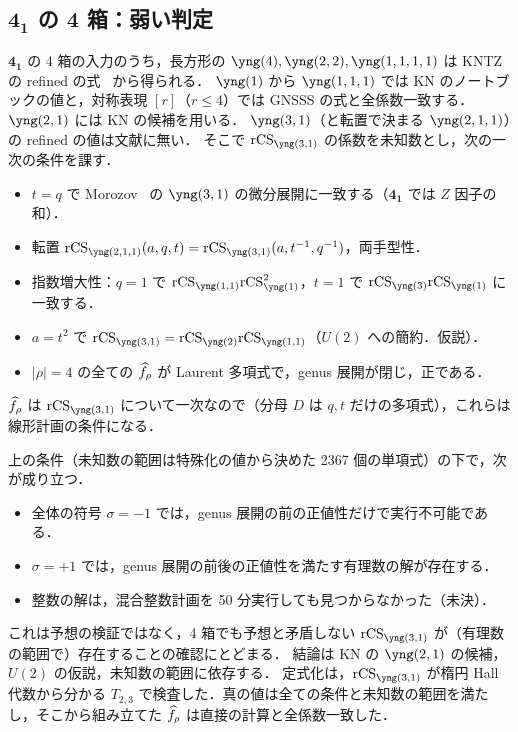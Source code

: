 \subsection{\texorpdfstring{$\mathbf{4_1}$ の 4 箱：弱い判定}{4\_1 の 4 箱：弱い判定}}\label{sec:fig8-four}
$\mathbf{4_1}$ の 4 箱の入力のうち，長方形の $\yng(4),\yng(2,2),\yng(1,1,1,1)$ は KNTZ の refined の式~\cite{Kameyama19} から得られる．
$\yng(1)$ から $\yng(1,1,1)$ では KN のノートブックの値と，対称表現 $[r]$（$r\le4$）では GNSSS の式と全係数一致する．
$\yng(2,1)$ には KN の候補を用いる．
$\yng(3,1)$（と転置で決まる $\yng(2,1,1)$）の refined の値は文献に無い．
そこで $\rCS_{\yng(3,1)}$ の係数を未知数とし，次の一次の条件を課す．
\begin{itemize}
\item $t=q$ で Morozov~\cite{Morozov16} の $\yng(3,1)$ の微分展開に一致する（$\mathbf{4_1}$ では $Z$ 因子の和）．
\item 転置 $\rCS_{\yng(2,1,1)}(a,q,t)=\rCS_{\yng(3,1)}(a,t^{-1},q^{-1})$，両手型性．
\item 指数増大性：$q=1$ で $\rCS_{\yng(1,1)}\rCS_{\yng(1)}^2$，$t=1$ で $\rCS_{\yng(3)}\rCS_{\yng(1)}$ に一致する．
\item $a=t^2$ で $\rCS_{\yng(3,1)}=\rCS_{\yng(2)}\rCS_{\yng(1,1)}$（$U(2)$ への簡約．仮説）．
\item $|\rho|=4$ の全ての $\widehat{f}_\rho$ が Laurent 多項式で，genus 展開が閉じ，正である．
\end{itemize}
$\widehat{f}_\rho$ は $\rCS_{\yng(3,1)}$ について一次なので（分母 $D$ は $q,t$ だけの多項式），これらは線形計画の条件になる．
\begin{compresult}\label{cr:fig8-four}
上の条件（未知数の範囲は特殊化の値から決めた 2367 個の単項式）の下で，次が成り立つ．
\begin{itemize}
\item 全体の符号 $\sigma=-1$ では，genus 展開の前の正値性だけで実行不可能である．
\item $\sigma=+1$ では，genus 展開の前後の正値性を満たす有理数の解が存在する．
\item 整数の解は，混合整数計画を 50 分実行しても見つからなかった（未決）．
\end{itemize}
\end{compresult}
これは予想の検証ではなく，4 箱でも予想と矛盾しない $\rCS_{\yng(3,1)}$ が（有理数の範囲で）存在することの確認にとどまる．
結論は KN の $\yng(2,1)$ の候補，$U(2)$ の仮説，未知数の範囲に依存する．
定式化は，$\rCS_{\yng(3,1)}$ が楕円 Hall 代数から分かる $T_{2,3}$ で検査した．真の値は全ての条件と未知数の範囲を満たし，そこから組み立てた $\widehat{f}_\rho$ は直接の計算と全係数一致した．

